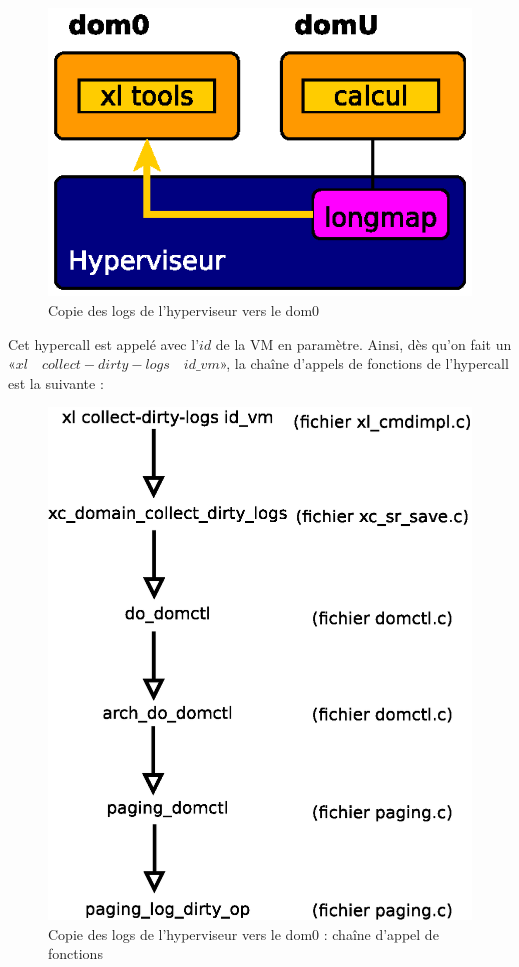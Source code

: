 \begin{figure}[H]
    \centering
    \includegraphics[scale=1]{chapters/4/fig4/collect-dirty-logs}
    \caption{Copie des logs de l'hyperviseur vers le dom0}
    \label{fig:collect-dirty-logs}
\end{figure}

\noindent Cet hypercall est appelé avec l'$id$ de la VM en paramètre. Ainsi, dès qu'on fait un «$xl \quad collect-dirty-logs \quad id\_vm$», la chaîne d'appels de fonctions de l'hypercall  est la suivante :
\begin{figure}[H]
    \centering
    \includegraphics[scale=.5]{chapters/4/fig4/collect-dirty-logs_appel_fonction}
    \caption{Copie des logs de l'hyperviseur vers le dom0 : chaîne d'appel de fonctions}
    \label{fig:collect-dirty-logs_appel_fonction}
\end{figure}

